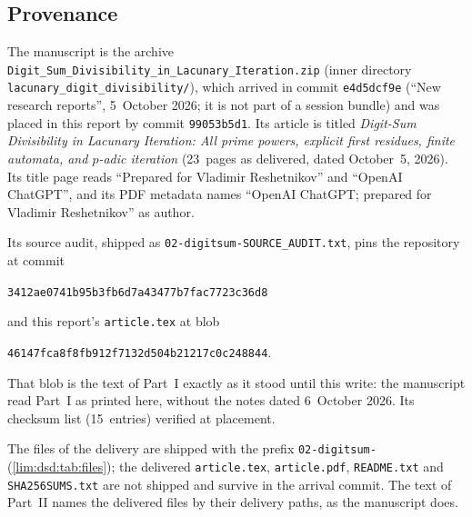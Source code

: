 \documentclass[11pt]{article}
\theoremstyle{definition}
\theoremstyle{remark}
\begin{document}
\subsection{Provenance}
\label{lim:dsd:sec:provenance}

The manuscript is the archive
\nolinkurl{Digit_Sum_Divisibility_in_Lacunary_Iteration.zip} (inner
directory \nolinkurl{lacunary_digit_divisibility/}), which arrived in commit
\texttt{e4d5dcf9e} (``New research reports'', 5~October 2026; it is not part
of a session bundle) and was placed in this report by commit
\texttt{99053b5d1}. Its article is titled \emph{Digit-Sum Divisibility in
Lacunary Iteration: All prime powers, explicit first residues, finite
automata, and $p$-adic iteration} (23~pages as delivered, dated October~5,
2026). Its title page reads ``Prepared for Vladimir Reshetnikov'' and
``OpenAI ChatGPT'', and its PDF metadata names ``OpenAI ChatGPT; prepared
for Vladimir Reshetnikov'' as author.

Its source audit, shipped as \nolinkurl{02-digitsum-SOURCE_AUDIT.txt},
pins the repository at commit
\begin{center}\small
\texttt{3412ae0741b95b3fb6d7a43477b7fac7723c36d8}
\end{center}
and this report's \texttt{article.tex} at blob
\begin{center}\small
\texttt{46147fca8f8fb912f7132d504b21217c0c248844}.
\end{center}
That blob is the text
of Part~I exactly as it stood until this write: the manuscript read Part~I
as printed here, without the notes dated 6~October 2026. Its checksum list
(15~entries) verified at placement.

The files of the delivery are shipped with the prefix \texttt{02-digitsum-}
(\cref{lim:dsd:tab:files}); the delivered \texttt{article.tex},
\texttt{article.pdf}, \texttt{README.txt} and \texttt{SHA256SUMS.txt} are
not shipped and survive in the arrival commit. The text of Part~II names the
delivered files by their delivery paths, as the manuscript does.
\end{document}
